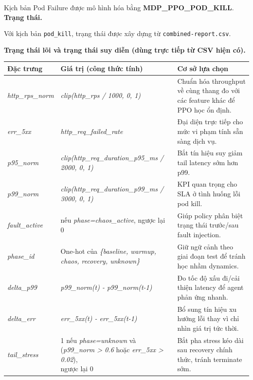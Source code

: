 \noindent Kịch bản Pod Failure được mô hình hóa bằng \textbf{MDP\_PPO\_POD\_KILL}.
\noindent\textbf{Trạng thái.}

\noindent Với kịch bản \texttt{pod\_kill}, trạng thái được xây dựng từ \texttt{combined-report.csv}. 

\noindent \textbf{Trạng thái lõi và trạng thái suy diễn (dùng trực tiếp từ CSV hiện có).}
\begin{center}
\setlength{\tabcolsep}{4pt}
\renewcommand{\arraystretch}{1.3}
\begin{tabular}{|>{\hspace{2pt}\raggedright\arraybackslash}p{}|>{\hspace{2pt}\raggedright\arraybackslash}p{}|>{\hspace{2pt}\raggedright\arraybackslash}p{}|}
\hline
\textbf{Đặc trưng} & \textbf{Giá trị (công thức tính)} & \textbf{Cơ sở lựa chọn} \\ \hline
\textit{http\_rps\_norm} & \textit{clip(http\_rps / 1000, 0, 1)} & Chuẩn hóa throughput về cùng thang đo với các feature khác để PPO học ổn định. \\ \hline
\textit{err\_5xx} & \textit{http\_req\_failed\_rate} & Đại diện trực tiếp cho mức vi phạm tính sẵn sàng dịch vụ. \\ \hline
\textit{p95\_norm} & \makecell[l]{\textit{clip(http\_req\_duration\_p95\_ms /}\\ \textit{2000, 0, 1)}} & Bắt tín hiệu suy giảm tail latency sớm hơn p99. \\ \hline
\textit{p99\_norm} & \makecell[l]{\textit{clip(http\_req\_duration\_p99\_ms /}\\ \textit{3000, 0, 1)}} & KPI quan trọng cho SLA ở tình huống lỗi pod kill. \\ \hline
\textit{fault\_active} & 1 nếu \textit{phase=chaos\_active}, ngược lại 0 & Giúp policy phân biệt trạng thái trước/sau fault injection. \\ \hline
\textit{phase\_id} & One-hot của \textit{\{baseline, warmup, chaos, recovery, unknown\}} & Giữ ngữ cảnh theo giai đoạn test để tránh học nhầm dynamics. \\ \hline
\textit{delta\_p99} & \textit{p99\_norm(t) - p99\_norm(t-1)} & Đo tốc độ xấu đi/cải thiện latency để agent phản ứng nhanh. \\ \hline
\textit{delta\_err} & \textit{err\_5xx(t) - err\_5xx(t-1)} & Bổ sung tín hiệu xu hướng lỗi thay vì chỉ nhìn giá trị tức thời. \\ \hline
\textit{tail\_stress} & \makecell[l]{1 nếu \textit{phase=unknown} và \\ (\textit{p99\_norm > 0.6} hoặc \textit{err\_5xx > 0.02}), \\ ngược lại 0} & Bắt pha stress kéo dài sau recovery chính thức, tránh terminate sớm. \\ \hline
\end{tabular}
\end{center}


